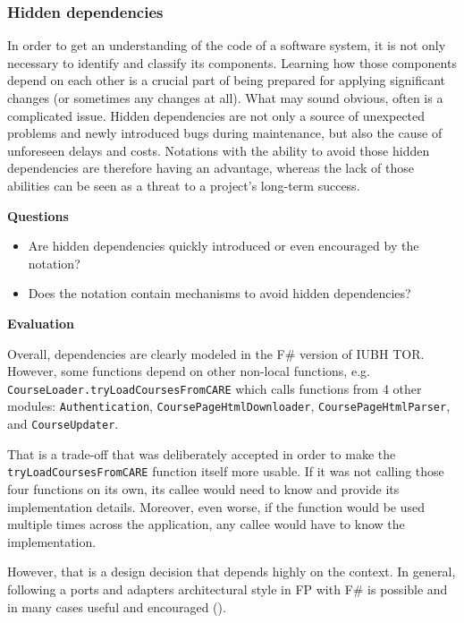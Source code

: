 \subsubsection{Hidden dependencies}

In order to get an understanding of the code of a software system, it is not only necessary to identify and classify its components. Learning how those components depend on each other is a crucial part of being prepared for applying significant changes (or sometimes any changes at all). What may sound obvious, often is a complicated issue. Hidden dependencies are not only a source of unexpected problems and newly introduced bugs during maintenance, but also the cause of unforeseen delays and costs. Notations with the ability to avoid those hidden dependencies are therefore having an advantage, whereas the lack of those abilities can be seen as a threat to a project's long-term success.

\textbf{Questions}

\begin{itemize}
\item Are hidden dependencies quickly introduced or even encouraged by the notation?
\item Does the notation contain mechanisms to avoid hidden dependencies?
\end{itemize}

\textbf{Evaluation}

Overall, dependencies are clearly modeled in the F\# version of IUBH TOR. However, some functions depend on other non-local functions, e.g. \texttt{CourseLoader.tryLoadCoursesFromCARE} which calls functions from 4 other modules: \texttt{Authentication}, \texttt{CoursePageHtmlDownloader}, \texttt{CoursePageHtmlParser}, and \texttt{CourseUpdater}.

That is a trade-off that was deliberately accepted in order to make the \texttt{tryLoadCoursesFromCARE} function itself more usable. If it was not calling those four functions on its own, its callee would need to know and provide its implementation details. Moreover, even worse, if the function would be used multiple times across the application, any callee would have to know the implementation.

However, that is a design decision that depends highly on the context. In general, following a ports and adapters architectural style in FP with F\# is possible and in many cases useful and encouraged (\cite{seemann_functional_2016}).

